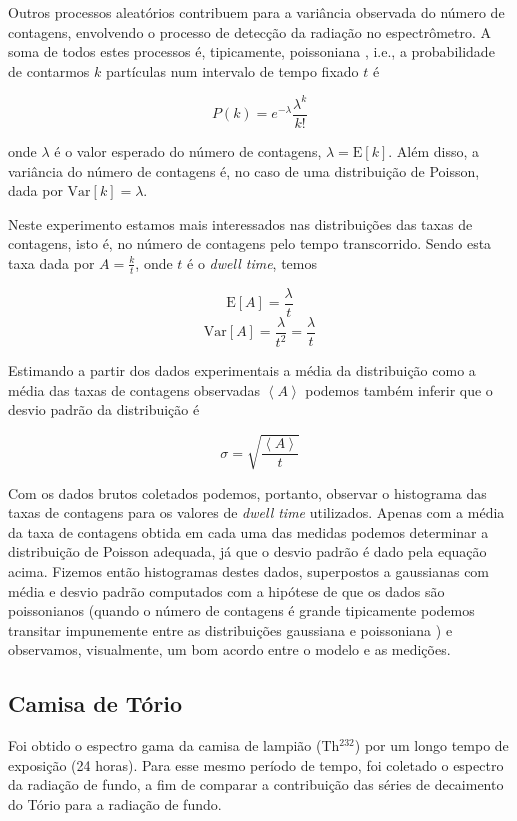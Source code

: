 \documentclass[a4paper, 11pt, notitlepage]{article}
\numberwithin{equation}{section}  %
\begin{document}
Outros processos aleatórios contribuem para a variância observada do número de contagens, envolvendo o processo de detecção da radiação no espectrômetro. A soma de todos estes processos é, tipicamente, poissoniana \cite{joyce1969}, i.e., a probabilidade de contarmos $k$ partículas num intervalo de tempo fixado $t$ é

$$ P(k) = e^{-\lambda} \frac{\lambda^k}{k!} $$

\noindent onde $\lambda$ é o valor esperado do número de contagens, $\lambda = \text{E} \left[ k \right]$. Além disso, a variância do número de contagens é, no caso de uma distribuição de Poisson, dada por $\text{Var}\left[k\right] = \lambda$.

Neste experimento estamos mais interessados nas distribuições das taxas de contagens, isto é, no número de contagens pelo tempo transcorrido. Sendo esta taxa dada por $A = \frac{k}{t}$, onde $t$ é o \textit{dwell time}, temos

$$ \text{E}\left[A \right] = \frac{\lambda}{t} $$
$$ \text{Var}\left[A \right] = \frac{\lambda}{t^2} = \frac{\lambda}{t} $$

Estimando a partir dos dados experimentais a média da distribuição como a média das taxas de contagens observadas $\left\langle A \right\rangle$ podemos também inferir que o desvio padrão da distribuição é

$$ \sigma = \sqrt{\frac{\left\langle A \right\rangle}{t}} $$

Com os dados brutos coletados podemos, portanto, observar o histograma das taxas de contagens para os valores de \textit{dwell time} utilizados. Apenas com a média da taxa de contagens obtida em cada uma das medidas podemos determinar a distribuição de Poisson adequada, já que o desvio padrão é dado pela equação acima. Fizemos então histogramas destes dados, superpostos a gaussianas com média e desvio padrão computados com a hipótese de que os dados são poissonianos (quando o número de contagens é grande tipicamente podemos transitar impunemente entre as distribuições gaussiana e poissoniana \cite{ruby1977, gucker1971}) e observamos, visualmente, um bom acordo entre o modelo e as medições.

\subsection{\label{sec:metodologia.torio}Camisa de Tório}

Foi obtido o espectro gama da camisa de lampião (Th$^{232}$) por um longo tempo de exposição (24 horas). Para esse mesmo período de tempo, foi coletado o espectro da radiação de fundo, a fim de comparar a contribuição das séries de decaimento do Tório para a radiação de fundo.
\end{document}
